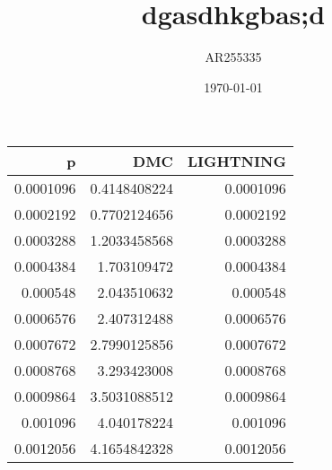 \documentclass[11pt]{article}
\author{AR255335}
\date{\today}
\title{dgasdhkgbas;d}
\begin{document}
\maketitle
\tableofcontents

\begin{center}
\begin{tabular}{rrr}
\hline
p & DMC & LIGHTNING\\
\hline
0.0001096 & 0.4148408224 & 0.0001096\\
0.0002192 & 0.7702124656 & 0.0002192\\
0.0003288 & 1.2033458568 & 0.0003288\\
0.0004384 & 1.703109472 & 0.0004384\\
0.000548 & 2.043510632 & 0.000548\\
0.0006576 & 2.407312488 & 0.0006576\\
0.0007672 & 2.7990125856 & 0.0007672\\
0.0008768 & 3.293423008 & 0.0008768\\
0.0009864 & 3.5031088512 & 0.0009864\\
0.001096 & 4.040178224 & 0.001096\\
0.0012056 & 4.1654842328 & 0.0012056\\
\hline
\end{tabular}
\end{center}
\end{document}
